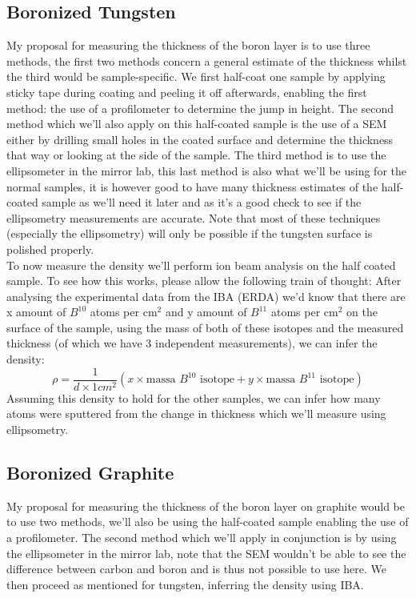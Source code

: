 \documentclass{article}
\begin{document}
\subsection{Boronized Tungsten}
My proposal for measuring the thickness
of the boron layer is to use three methods, the first two methods concern a
general estimate of the thickness whilst the third would be sample-specific.
We first half-coat one sample by applying sticky tape during coating and
peeling it off afterwards, enabling the first method: the use of a profilometer
to determine the jump in height. The second method which we'll also apply on
this half-coated sample is the use of a SEM either by drilling small holes in
the coated surface and determine the thickness that way or looking at the side
of the sample.  The third method is to use the ellipsometer in the mirror lab,
this last method is also what we'll be using for the normal samples, it is
however good to have many thickness estimates of the half-coated sample as
we'll need it later and as it's a good check to see if the ellipsometry
measurements are accurate.  Note that most of these techniques (especially the
ellipsometry) will only be possible if the tungsten surface is polished properly.
 \vspace{0.2cm} \\
To now measure the density we'll perform ion beam analysis on the half coated
sample. To see how this works, please allow the following train of thought: After
analysing the experimental data from the IBA (ERDA) we'd know that there are x amount
of $B^{10}$ atoms per cm$^2$ and y amount of $B^{11}$ atoms per cm$^2$ on the
surface of the sample, using the mass of both of these isotopes and the
measured thickness (of which we have 3 independent measurements), we can infer
the density:
\begin{equation}
    \rho = \frac{1}{d \times 1 cm^2} \left( x \times \text{massa }B^{10}   \text{ isotope} + y \times \text{massa }B^{11}   \text{ isotope}\right)
\end{equation}
Assuming this density to hold for the other samples, we can infer how many atoms 
were sputtered from the change in thickness which we'll measure using ellipsometry.
\subsection{Boronized Graphite}
My proposal for measuring the thickness of the boron layer on graphite would be
to use two methods, we'll also be using the half-coated sample enabling the use
of a profilometer. The second method which we'll apply in conjunction is by
using the ellipsometer in the mirror lab, note that the SEM wouldn't be able to
see the difference between carbon and boron and is thus not possible to use
here. We then proceed as mentioned for tungsten, inferring the density using
IBA.
\end{document}

